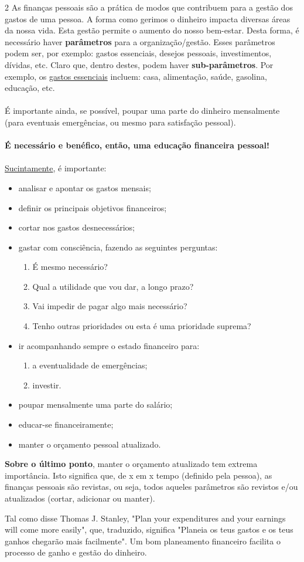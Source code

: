 \documentclass[a4paper,11pt]{article}
\begin{document}
\begin{multicols}{2}
As finanças pessoais são a prática de modos que contribuem para a gestão dos gastos de uma pessoa. A forma como gerimos o dinheiro impacta diversas áreas da nossa vida. Esta gestão permite o aumento do nosso bem-estar. Desta forma, é necessário haver \textbf{parâmetros} para a organização/gestão. Esses parâmetros podem ser, por exemplo: gastos essenciais, desejos pessoais, investimentos, dívidas, etc. Claro que, dentro destes, podem haver \textbf{sub-parâmetros}. Por exemplo, os \underline{gastos essenciais} incluem: casa, alimentação, saúde, gasolina, educação, etc. \\ \\É importante ainda, se possível, poupar uma parte do dinheiro mensalmente (para eventuais emergências, ou mesmo para satisfação pessoal).\\ \\ \textbf{É necessário e benéfico, então, uma educação financeira pessoal!} \\ \\
\underline{Sucintamente}, é importante:
\begin{itemize}
\item analisar e apontar os gastos mensais;
\item definir os principais objetivos financeiros;
\item cortar nos gastos desnecessários;
\item gastar com consciência, fazendo as seguintes perguntas:
\begin{enumerate}
\item É mesmo necessário?
\item Qual a utilidade que vou dar, a longo prazo?
\item Vai impedir de pagar algo mais necessário?
\item Tenho outras prioridades ou esta é uma prioridade suprema?
\end{enumerate}
\item ir acompanhando sempre o estado financeiro para:
\begin{enumerate}
\item a eventualidade de emergências;
\item investir.
\end{enumerate}
\item poupar mensalmente uma parte do salário;
\item educar-se financeiramente;
\item manter o orçamento pessoal atualizado.
\end{itemize}
\textbf{Sobre o último ponto}, manter o orçamento atualizado tem extrema importância. Isto significa que, de x em x tempo (definido pela pessoa), as finanças pessoais são revistas, ou seja, todos aqueles parâmetros são revistos e/ou atualizados (cortar, adicionar ou manter).
\end{multicols}
Tal como disse Thomas J. Stanley, "Plan your expenditures and your earnings will come more easily", que, traduzido, significa "Planeia os teus gastos e os teus ganhos chegarão mais facilmente". Um bom planeamento financeiro facilita o processo de ganho e gestão do dinheiro.
\end{document}
